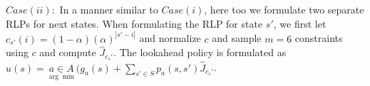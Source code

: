 $Case (ii):$ In a manner similar to $Case (i)$, here too we formulate two separate RLPs for next states. When formulating the RLP for state $s'$, we first let $c_{s'}(i)=(1-\alpha)(\alpha)^{|s'-i|}$ and normalize $c$ and sample $m=6$ constraints using $c$ and compute $\hat{J}_{c_s'}$. The lookahead policy is formulated as $u(s)=\underset{\arg\min}{a\in A}(g_a(s)+\underset{s'\in S}{\sum}p_a(s,s')\hat{J}_{c_s'}$.
